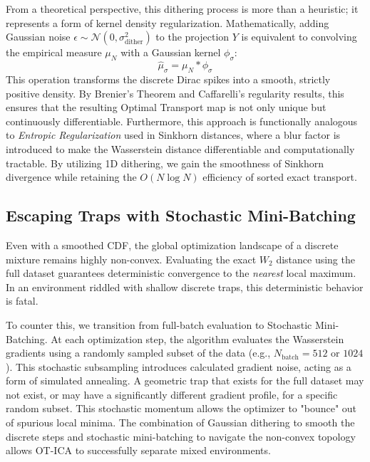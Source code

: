\documentclass[12pt,a4paper,twoside,openany]{book}
\begin{document}
From a theoretical perspective, this dithering process is more than a heuristic; it represents a form of kernel density regularization. Mathematically, 
adding Gaussian noise $\epsilon \sim \mathcal{N}(0, \sigma_{\text{dither}}^2)$ to the projection $Y$ is equivalent to convolving the empirical measure $\mu_N$ with 
a Gaussian kernel $\phi_{\sigma}$:
\begin{equation}
    \hat{\mu}_{\sigma} = \mu_N * \phi_{\sigma}
\end{equation}
This operation transforms the discrete Dirac spikes into a smooth, strictly positive density. By Brenier's Theorem \cite{brenier1991} and Caffarelli's regularity \cite{caffarelli1992} results, 
this ensures that the resulting Optimal Transport map is not only unique but continuously differentiable. Furthermore, this approach is functionally analogous 
to \textit{Entropic Regularization} used in Sinkhorn distances, where a blur factor is introduced to make the Wasserstein distance differentiable and computationally tractable. 
By utilizing 1D dithering, we gain the smoothness of Sinkhorn divergence while retaining the $O(N \log N)$ efficiency of sorted exact transport.

\subsection{Escaping Traps with Stochastic Mini-Batching}
Even with a smoothed CDF, the global optimization landscape of a discrete mixture remains highly non-convex. Evaluating the exact $W_2$ distance using the 
full dataset guarantees deterministic convergence to the \textit{nearest} local maximum. In an environment riddled with shallow discrete traps, this deterministic behavior is fatal.

To counter this, we transition from full-batch evaluation to Stochastic Mini-Batching. At each optimization step, the algorithm evaluates 
the Wasserstein gradients using a randomly sampled subset of the data (e.g., $N_{\text{batch}} = 512$ or $1024$). This stochastic subsampling introduces calculated gradient noise, 
acting as a form of simulated annealing. A geometric trap that exists for the full dataset may not exist, or may have a significantly different gradient profile, for a specific random subset. 
This stochastic momentum allows the optimizer to "bounce" out of spurious local minima. The combination of Gaussian dithering to smooth 
the discrete steps and stochastic mini-batching to navigate the non-convex topology allows OT-ICA to successfully separate mixed environments.
\end{document}
